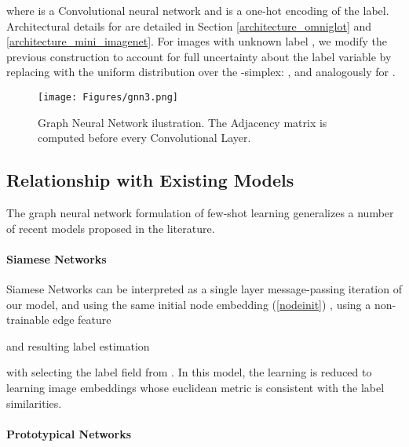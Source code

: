 \documentclass{article} \usepackage{iclr2018_conference,times}
\begin{document}
where  is a Convolutional neural network and  is a one-hot encoding of the label. Architectural
details for  are detailed in Section \ref{architecture_omniglot} and \ref{architecture_mini_imagenet}. 
For images  with unknown label , we modify the previous construction 
to account for full uncertainty about the label variable by replacing  with the uniform 
distribution over the -simplex: , and analogously 
for .

\begin{figure}
    
    \centering
    \texttt{[image: Figures/gnn3.png]}

    \caption{Graph Neural Network ilustration. The Adjacency matrix is computed before every Convolutional Layer.}
    \label{fig:gnn2}
\end{figure} 






















\subsection{Relationship with Existing Models}


The graph neural network formulation of few-shot learning generalizes 
a number of recent models proposed in the literature.

\paragraph{Siamese Networks}
Siamese Networks \cite{koch2015siamese} can be interpreted as 
a single layer message-passing iteration of our model, and using the same initial
node embedding (\ref{nodeinit})  , using a non-trainable 
edge feature 

and resulting label estimation

with  selecting the label field from . In this model, 
the learning is reduced to learning image embeddings  whose 
euclidean metric is consistent with the label similarities. 



\paragraph{Prototypical Networks}
\end{document}
